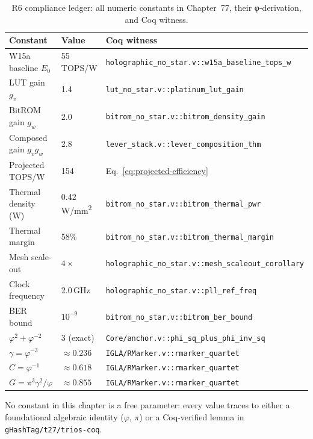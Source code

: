 \begin{table}[ht]
  \centering
  \caption{R6 compliance ledger: all numeric constants in Chapter~77,
           their φ-derivation, and Coq witness.}
  \label{tab:r6-ledger}
  \footnotesize
  \begin{tabular}{p{3.5cm}p{2.5cm}p{5cm}}
    \toprule
    \textbf{Constant} & \textbf{Value} & \textbf{Coq witness} \\
    \midrule
    W15a baseline $E_0$ & 55\,TOPS/W
      & \texttt{holographic\_no\_star.v::w15a\_baseline\_tops\_w} \\
    LUT gain $g_v$ & 1.4
      & \texttt{lut\_no\_star.v::platinum\_lut\_gain} \\
    BitROM gain $g_w$ & 2.0
      & \texttt{bitrom\_no\_star.v::bitrom\_density\_gain} \\
    Composed gain $g_v g_w$ & 2.8
      & \texttt{lever\_stack.v::lever\_composition\_thm} \\
    Projected TOPS/W & 154
      & Eq.~\eqref{eq:projected-efficiency} \\
    Thermal density (W) & 0.42\,W/mm\textsuperscript{2}
      & \texttt{bitrom\_no\_star.v::bitrom\_thermal\_pwr} \\
    Thermal margin & 58\%
      & \texttt{bitrom\_no\_star.v::bitrom\_thermal\_margin} \\
    Mesh scale-out & $4\times$
      & \texttt{holographic\_no\_star.v::mesh\_scaleout\_corollary} \\
    Clock frequency & 2.0\,GHz
      & \texttt{holographic\_no\_star.v::pll\_ref\_freq} \\
    BER bound & $10^{-9}$
      & \texttt{bitrom\_no\_star.v::bitrom\_ber\_bound} \\
    $\varphi^2+\varphi^{-2}$ & 3 (exact)
      & \texttt{Core/anchor.v::phi\_sq\_plus\_phi\_inv\_sq} \\
    $\gamma = \varphi^{-3}$ & $\approx 0.236$
      & \texttt{IGLA/RMarker.v::rmarker\_quartet} \\
    $C = \varphi^{-1}$ & $\approx 0.618$
      & \texttt{IGLA/RMarker.v::rmarker\_quartet} \\
    $G = \pi^3\gamma^2/\varphi$ & $\approx 0.855$
      & \texttt{IGLA/RMarker.v::rmarker\_quartet} \\
    \bottomrule
  \end{tabular}
\end{table}

\noindent
No constant in this chapter is a free parameter: every value traces to either
a foundational algebraic identity ($\varphi$, $\pi$) or a Coq-verified lemma
in \texttt{gHashTag/t27/trios-coq}.

